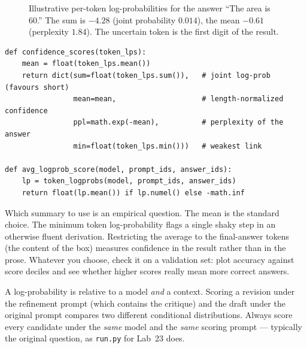 \begin{figure}[t]
\centering
{}
\caption{Illustrative per-token log-probabilities for the answer ``The area is 60.'' The sum is
$-4.28$ (joint probability $0.014$), the mean $-0.61$ (perplexity $1.84$). The uncertain token is the
first digit of the result.}
\label{fig:refine:pertoken}
\end{figure}

\begin{lstlisting}[caption={Confidence summaries from token log-probabilities (Lab 23, Task 3).},label={lst:refine:conf}]
def confidence_scores(token_lps):
    mean = float(token_lps.mean())
    return dict(sum=float(token_lps.sum()),   # joint log-prob (favours short)
                mean=mean,                    # length-normalized confidence
                ppl=math.exp(-mean),          # perplexity of the answer
                min=float(token_lps.min()))   # weakest link

def avg_logprob_score(model, prompt_ids, answer_ids):
    lp = token_logprobs(model, prompt_ids, answer_ids)
    return float(lp.mean()) if lp.numel() else -math.inf
\end{lstlisting}

Which summary to use is an empirical question. The mean is the standard choice. The minimum token
log-probability flags a single shaky step in an otherwise fluent derivation. Restricting the average
to the final-answer tokens (the content of the box) measures confidence in the result rather than in
the prose. Whatever you choose, check it on a validation set: plot accuracy against score deciles and
see whether higher scores really mean more correct answers.

\begin{pitfall}
A log-probability is relative to a model \emph{and} a context. Scoring a revision under the
refinement prompt (which contains the critique) and the draft under the original prompt compares
two different conditional distributions. Always score every candidate under the \emph{same} model
and the \emph{same} scoring prompt --- typically the original question, as \texttt{run.py} for Lab~23
does.
\end{pitfall}


